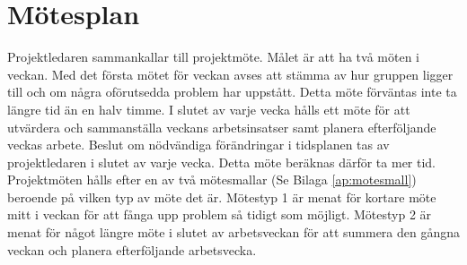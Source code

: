 \section{Mötesplan}

Projektledaren sammankallar till projektmöte. Målet är att ha två möten i veckan. Med det första mötet för veckan avses att stämma av hur gruppen ligger till och om några oförutsedda problem har uppstått. Detta möte förväntas inte ta längre tid än en halv timme. I slutet av varje vecka hålls ett möte för att utvärdera och sammanställa veckans arbetsinsatser samt planera efterföljande veckas arbete. Beslut om nödvändiga förändringar i tidsplanen tas av projektledaren i slutet av varje vecka. Detta möte beräknas därför ta mer tid. \\
Projektmöten hålls efter en av två mötesmallar (Se Bilaga \ref{ap:motesmall}) beroende på vilken typ av möte det är. Mötestyp 1 är menat för kortare möte mitt i veckan för att fånga upp problem så tidigt som möjligt. Mötestyp 2 är menat för något längre möte i slutet av arbetsveckan för att summera den gångna veckan och planera efterföljande arbetsvecka.
